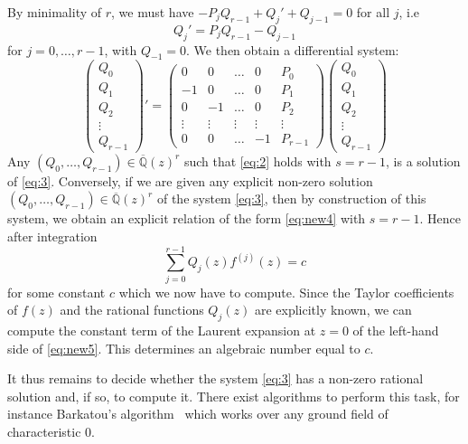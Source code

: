\documentclass[reqno,english,12pt,a4paper]{smfart}
\numberwithin{equation}{section}
\def\Qbar{\overline{\mathbb Q}}
\begin{document}
By minimality of $r$, we must have $-P_jQ_{r-1}+ Q_j'+Q_{j-1} =0$ for all 
$j$, i.e 
$$
Q_j'=P_jQ_{r-1}-Q_{j-1}
$$ 
for 
$j=0, \ldots, r-1$, with $Q_{-1}=0$. We then obtain a differential system:
\begin{equation}\label{eq:3}
\left(\begin{matrix}
Q_0
\\
Q_1
\\
Q_2
\\
\vdots
\\
Q_{r-1}
\end{matrix} 
\right)' = 
\left(\begin{matrix}
0 &0 &\ldots &0&P_0
\\
-1 &0 &\ldots &0&P_1
\\
0 &-1 &\ldots &0&P_2
\\
\vdots&\vdots & \vdots &\vdots&\vdots 
\\
0 &0 &\ldots &-1&P_{r-1}
\end{matrix} 
\right)
\left(\begin{matrix}
Q_0
\\
Q_1
\\
Q_2
\\
\vdots
\\
Q_{r-1}
\end{matrix} 
\right)
\end{equation}
Any $(Q_0, \ldots, Q_{r-1})\in \Qbar(z)^{r}$ such that \eqref{eq:2} holds with $s=r-1$, is a solution of \eqref{eq:3}. Conversely, if we are given any   
explicit non-zero solution $(Q_0, \ldots, Q_{r-1})\in \Qbar(z)^{r}$ of the system \eqref{eq:3}, then by construction of this system, 
we obtain an explicit  relation 
of the form \eqref{eq:new4} with $s=r-1$. Hence after integration
\begin{equation}\label{eq:new5}
\sum_{j=0}^{r-1} Q_j(z)f^{(j)}(z)=c
\end{equation}
for some constant $c$ which we now have to compute. Since the Taylor coefficients of $f(z)$ and the rational functions $Q_j(z)$ are explicitly known, we can compute the constant term of the Laurent expansion at $z=0$ of the left-hand side of \eqref{eq:new5}. This determines an algebraic number equal to $c$.

It thus remains to decide whether the system  \eqref{eq:3} 
has a non-zero rational solution and, if so, to compute it.  There exist algorithms to perform this task, for instance Barkatou's algorithm~\cite{barkatou} which works over any ground field of characteristic $0$.
\end{document}
